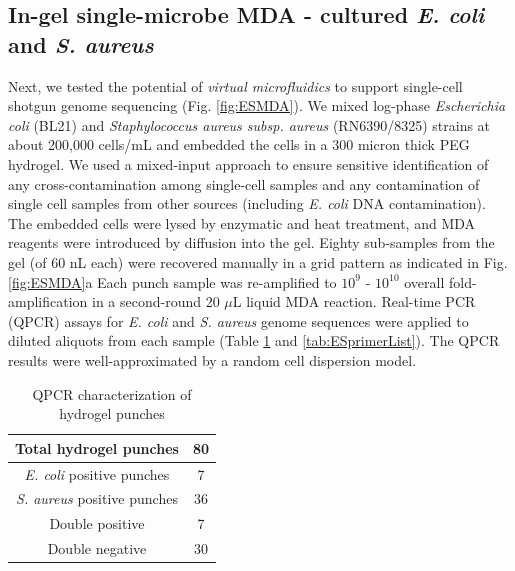 \subsection{In-gel single-microbe MDA - cultured \textit{E. coli}  and \textit{S. aureus}}
Next, we tested the potential of \textit{virtual microfluidics} to support single-cell shotgun genome sequencing (Fig. \ref{fig:ESMDA}). We mixed log-phase \textit{Escherichia coli} (BL21) and \textit{Staphylococcus aureus subsp. aureus} (RN6390\slash 8325) strains at about 200,000 cells\slash mL and embedded the cells in a 300 micron thick PEG hydrogel. We used a mixed-input approach to ensure sensitive identification of any cross-contamination among single-cell samples and any contamination of single cell samples from other sources (including \textit{E. coli}  DNA contamination). The embedded cells were lysed by enzymatic and heat treatment, and MDA reagents were introduced by diffusion into the gel. Eighty sub-samples from the gel (of 60 nL each) were recovered manually in a grid pattern as indicated in Fig. \ref{fig:ESMDA}a Each punch sample was re-amplified to $10^{9}$ - $10^{10}$ overall fold-amplification in a second-round 20 $\mu$L liquid MDA reaction. Real-time PCR (QPCR) assays for \textit{E. coli}  and \textit{S. aureus}  genome sequences were applied to diluted aliquots from each sample (Table \ref{tab:QpcrHydrogel} and \ref{tab:ESprimerList}). The QPCR results were well-approximated by a random cell dispersion model.

\begin{table}
\centering 
\caption{QPCR characterization of hydrogel punches}
\label{tab:QpcrHydrogel}
\begin{adjustbox}{max width=0.7\textwidth}
\begin{tabular}{c||c} 

\hline 
Total hydrogel punches & 80 \\ 
\hline
\textit{E. coli} positive punches & 7  \\
\hline
\textit{S. aureus} positive punches & 36 \\
\hline
Double positive & 7 \\
\hline
Double negative & 30 \\
\hline
\end{tabular}
\end{adjustbox}
\end{table}

